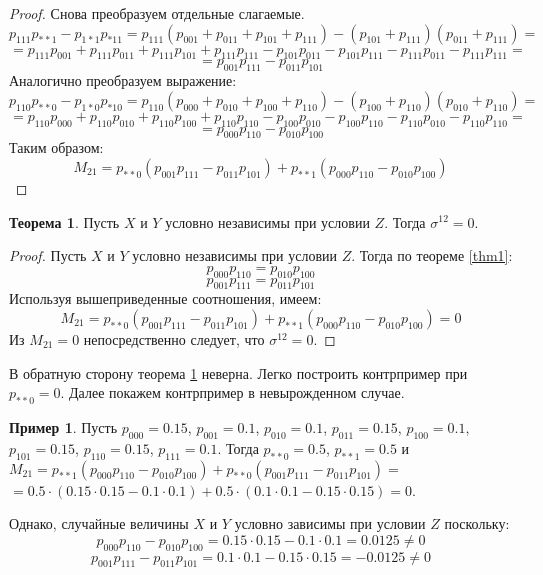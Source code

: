 \documentclass[a4paper,14pt]{extarticle}
\theoremstyle{definition}
\newtheorem{theorem}{Теорема}[section]
\newtheorem{example}{Пример}[section]
\begin{document}
\begin{proof}
    Снова преобразуем отдельные слагаемые.
    $$
        p_{111}p_{**1}-p_{1*1}p_{*11} = p_{111}(p_{001}+p_{011}+p_{101}+p_{111})-
        (p_{101}+p_{111})(p_{011}+p_{111})=
    $$
    $$
        = p_{111}p_{001}+p_{111}p_{011}+p_{111}p_{101}+p_{111}p_{111}
        - p_{101}p_{011}-p_{101}p_{111}-p_{111}p_{011}-p_{111}p_{111}=
    $$
    $$
        = p_{001}p_{111}-p_{011}p_{101}
    $$
    Аналогично преобразуем выражение:
    $$
        p_{110}p_{**0}-p_{1*0}p_{*10}=
        p_{110}(p_{000}+p_{010}+p_{100}+p_{110})-(p_{100}+p_{110})(p_{010}+p_{110})=
    $$
    $$
        =p_{110}p_{000}+p_{110}p_{010}+p_{110}p_{100}+p_{110}p_{110}
        -p_{100}p_{010}-p_{100}p_{110}-p_{110}p_{010}-p_{110}p_{110}=
    $$
    $$
        =p_{000}p_{110}-p_{010}p_{100}
    $$
    Таким образом:
    $$
        M_{21} = p_{**0}(p_{001}p_{111}-p_{011}p_{101}) + p_{**1} (p_{000}p_{110}-p_{010}p_{100})
    $$
\end{proof}
\begin{theorem}\label{1.2}
    Пусть $X$ и $Y$ условно независимы при условии $Z$. Тогда $\sigma^{12}=0$.
\end{theorem}
\begin{proof}
    Пусть $X$ и $Y$ условно независимы при условии $Z$. Тогда по теореме \ref{thm1}:
    $$p_{000}p_{110}=p_{010}p_{100}$$
    $$p_{001}p_{111}=p_{011}p_{101}$$
    Используя вышеприведенные соотношения, имеем:
    $$
        M_{21} = p_{**0}(p_{001}p_{111}-p_{011}p_{101}) + p_{**1} (p_{000}p_{110}-p_{010}p_{100})= 0
    $$
    Из $M_{21}=0$ непосредственно следует, что $\sigma^{12}=0$.
\end{proof}
В обратную сторону теорема \ref{1.2} неверна. Легко построить контрпример при $p_{**0}=0$. Далее покажем контрпример в невырожденном случае.
\begin{example}
    Пусть $p_{000}=0.15$, $p_{001}=0.1$, $p_{010}=0.1$, $p_{011}=0.15$, $p_{100}=0.1$, $p_{101}=0.15$, $p_{110}=0.15$, $p_{111}=0.1$.
    Тогда $p_{**0}=0.5$, $p_{**1}=0.5$ и
    $M_{21} = p_{**1}(p_{000}p_{110}-p_{010}p_{100}) + p_{**0}(p_{001}p_{111}-p_{011}p_{101})=$
    $= 0.5 \cdot (0.15 \cdot 0.15 - 0.1 \cdot 0.1) + 0.5 \cdot (0.1 \cdot 0.1 - 0.15 \cdot 0.15) = 0$.

    Однако, случайные величины $X$ и $Y$ условно зависимы при условии $Z$ поскольку:
    $$
        p_{000}p_{110}-p_{010}p_{100}=0.15 \cdot 0.15 - 0.1 \cdot 0.1 = 0.0125 \neq 0
    $$
    $$
        p_{001}p_{111}-p_{011}p_{101}=0.1 \cdot 0.1 - 0.15 \cdot 0.15 = -0.0125 \neq 0
    $$
\end{example}
\end{document}
